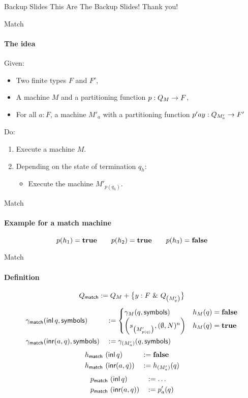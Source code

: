 
\begin{frame}{Backup Slides}
  This Are The Backup Slides!
  \vfill
  Thank you!
\end{frame}

\begin{frame}{Match}
  \framesubtitle{The idea}
  Given:
  \begin{itemize}
    \item Two finite types $F$ and $F'$,
    \item A machine $M$ and a partitioning function $p : Q_M \rightarrow F$,
    \item For all $a:F$, a machine $M'_a$ with a partitioning function $p'ay : Q_{M'_a} \rightarrow F'$
  \end{itemize}
  Do:
  \begin{enumerate}
    \item Execute a machine $M$.
    \item Depending on the state of termination $q_h$:
      \begin{itemize}
        \item Execute the machine $M'_{p(q_h)}$.
      \end{itemize}
  \end{enumerate}
\end{frame}

\begin{frame}{Match}
  \framesubtitle{Example for a match machine}
	\vspace{-1cm}
  
  \[
    p(h_1) = \mathbf{true} \qquad p(h_2) = \mathbf{true} \qquad p(h_3) = \mathbf{false}
  \]
\end{frame}

\begin{frame}{Match}
  \framesubtitle{Definition}
  \footnotesize
  $$Q_{\textsf{match}} := Q_M + \bigl\{ y:F~{\&}~Q_{ \left( M'_{y} \right) } \bigr \}$$
  \begin{alignat*}{2}
    \gamma_{\textsf{match}} & (\operatorname{\textsf{inl}} q, \textsf{symbols}) &&:=
    \begin{cases}
      \gamma_{M}(q, \textsf{symbols})                                & h_M(q) = \mathbf{false} \\
      \left( s_{\left(M'_{p(q)}\right)}, (\emptyset, N)^n \right)  & h_M(q) = \mathbf{true}
    \end{cases} \\
    \gamma_{\textsf{match}} & (\operatorname{\textsf{inr}} (a, q), \textsf{symbols}) &&:= \gamma_{\left({M'_a}\right)}(q, \textsf{symbols})
  \end{alignat*}
  \begin{alignat*}{3}
    h_{\textsf{match}} &~ (\operatorname{\textsf{inl}}      q) &&:= \mathbf{false} \\
    h_{\textsf{match}} &~ (\operatorname{\textsf{inr}} (a, q)) &&:= h_{\left( M'_a \right)}(q)
  \end{alignat*}
  \begin{alignat*}{3}
    p_{\textsf{match}} &~ (\operatorname{\textsf{inl}}      q) &&:= \dots \\
    p_{\textsf{match}} &~ (\operatorname{\textsf{inr}} (a, q)) &&:= p'_a(q)
  \end{alignat*}
\end{frame}

